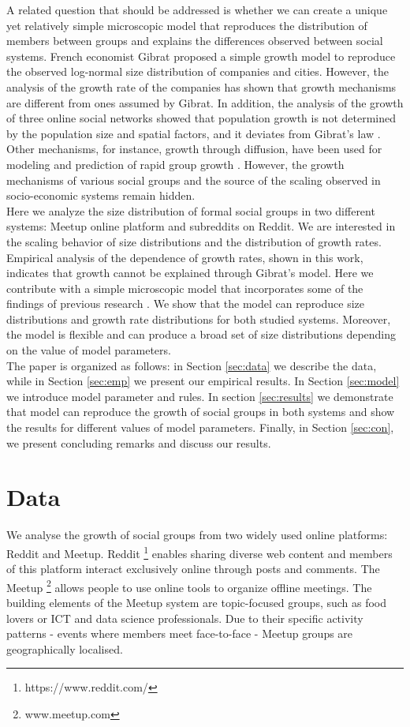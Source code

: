 A related question that should be addressed is whether we can create a unique yet relatively simple microscopic model that reproduces the distribution of members between groups and explains the differences observed between social systems. French economist Gibrat proposed a simple growth model to reproduce the observed log-normal size distribution of companies and cities. However, the analysis of the growth rate of the companies \cite{amaral1997scaling} has shown that growth mechanisms are different from ones assumed by Gibrat. In addition, the analysis of the growth of three online social networks showed that population growth is not determined by the population size and spatial factors, and it deviates from Gibrat's law \cite{zhu2014online}. Other mechanisms, for instance, growth through diffusion, have been used for modeling and prediction of rapid group growth \cite{kairam2012life}. However, the growth mechanisms of various social groups and the source of the scaling observed in socio-economic systems remain hidden.\\

Here we analyze the size distribution of formal social groups in two different systems: Meetup online platform and subreddits on Reddit. We are interested in the scaling behavior of size distributions and the distribution of growth rates. Empirical analysis of the dependence of growth rates, shown in this work, indicates that growth cannot be explained through Gibrat's model. Here we contribute with a simple microscopic model that incorporates some of the findings of previous research \cite{backstrom2006group, zheleva2009co}. We show that the model can reproduce size distributions and growth rate distributions for both studied systems. Moreover, the model is flexible and can produce a broad set of size distributions depending on the value of model parameters.\\

The paper is organized as follows: in Section \ref{sec:data} we describe the data, while in Section \ref{sec:emp} we present our empirical results. In Section \ref{sec:model} we introduce model parameter and rules. In section \ref{sec:results} we demonstrate that model can reproduce the growth of social groups in both systems and show the results for different values of model parameters. Finally, in Section \ref{sec:con}, we present concluding remarks and discuss our results. 

\section{Data \label{sec:data}}
We analyse the growth of social groups from two widely used online platforms: Reddit and Meetup. Reddit \footnote{https://www.reddit.com/} enables sharing diverse web content and members of this platform interact exclusively online through posts and comments. The Meetup \footnote{www.meetup.com} allows people to use online tools to organize offline meetings. The building elements of the Meetup system are topic-focused groups, such as food lovers or ICT and data science professionals. Due to their specific activity patterns - events where members meet face-to-face - Meetup groups are geographically localised. 

